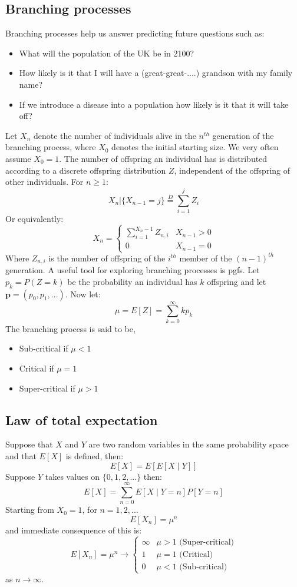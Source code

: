 \documentclass[12pt]{article}
\begin{document}
\subsection*{Branching processes}
Branching processes help us answer predicting future questions such as:
\begin{itemize}
    \item What will the population of the UK be in 2100?
    \item How likely is it that I will have a (great-great-....) grandson with my family name?
    \item If we introduce a disease into a population how likely is it that it will take off?
\end{itemize}
Let \(X_n\) denote the number of individuals alive in the \(n^{th}\) generation of the branching process, where \(X_0\) denotes the initial starting size. We very often assume \(X_0=1\). The number of offspring an individual has is distributed according to a discrete offspring distribution \(Z\), independent of the offspring of other individuals. For \(n\geq1\):
\[X_n|\{X_{n-1}=j\}\overset{D}{=}\sum^j_{i=1}Z_i\]
Or equivalently:
\[X_n=\begin{cases}
    \sum^{X_n-1}_{i=1}Z_{n,i}& X_{n-1}>0 \\
    0 & X_{n-1}=0
\end{cases}\]
Where \(Z_{n,i}\) is the number of offspring of the \(i^{th}\) member of the \((n-1)^{th}\) generation. A useful tool for exploring branching processes is pgfs. Let \(p_k=P(Z=k)\) be the probability an individual has \(k\) offspring and let \(\textbf{p}=(p_0,p_1,\dots)\). Now let:
\[\mu=E[Z]=\sum^\infty_{k=0}kp_k\]
The branching process is said to be,
\begin{itemize}
    \item Sub-critical if \(\mu<1\)
    \item Critical if \(\mu=1\)\
    \item Super-critical if \(\mu>1\)
\end{itemize}
\subsection*{Law of total expectation}
Suppose that \(X\) and \(Y\) are two random variables in the same probability space and that \(E[X]\) is defined, then:
\[E[X]=E[E[X\mid Y]]\]
Suppose \(Y\) takes values on \(\{0,1,2,...\}\) then:
\[E[X]=\sum^\infty_{n=0}E[X\mid Y=n]P[Y=n]\]
Starting from \(X_0=1\), for \(n=1,2,...\)
\[E[X_n]=\mu^n\]
and immediate consequence of this is:
\[E[X_n]=\mu^n\to\begin{cases}
    \infty& \mu>1\text{ (Super-critical)} \\
    1 & \mu=1 \text{ (Critical)} \\
    0 & \mu<1 \text{ (Sub-critical)}
\end{cases}\]
as \(n\to\infty\).
\end{document}
